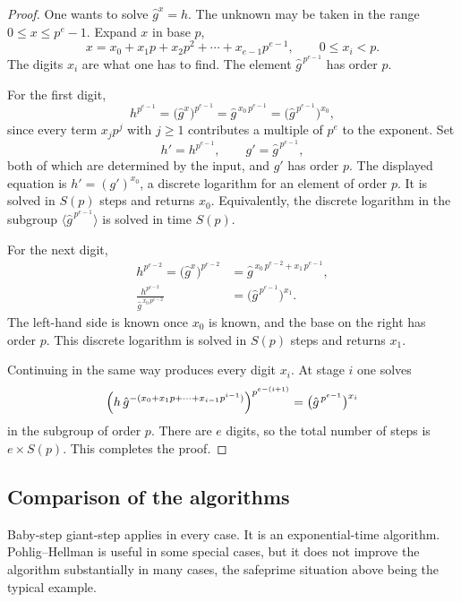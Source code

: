 \begin{proof}
One wants to solve \(\hat g^{x}=h\). The unknown may be taken in the
range \(0\le x\le p^e-1\).
Expand \(x\) in base \(p\),
\[
    x = x_0 + x_1 p + x_2 p^2 + \cdots + x_{e-1}p^{e-1},
    \qquad 0\le x_i<p.
\]
The digits \(x_i\) are what one has to find. The element
\(\hat g^{\,p^{e-1}}\) has order \(p\).

For the first digit, 
\[
    h^{p^{e-1}}
    = \bigl(\hat g^{x}\bigr)^{p^{e-1}}
    = \hat g^{\,x_0\,p^{e-1}}
    = \bigl(\hat g^{\,p^{e-1}}\bigr)^{x_0},
\]
since every term \(x_j p^j\) with \(j\ge 1\) contributes a multiple of
\(p^e\) to the exponent. Set
\[
    h' = h^{p^{e-1}},
    \qquad
    g' = \hat g^{\,p^{e-1}},
\]
both of which are determined by the input, and \(g'\) has order \(p\).
The displayed equation is \(h'=(g')^{x_0}\), a discrete logarithm for an
element of order \(p\). It is solved in \(S(p)\) steps and returns
\(x_0\). Equivalently, the discrete logarithm in the subgroup
\(\langle\hat g^{\,p^{e-1}}\rangle\) is solved in time \(S(p)\).

For the next digit,
\begin{align*}
    h^{p^{e-2}}
    = \bigl(\hat g^{x}\bigr)^{p^{e-2}}
    &= \hat g^{\,x_0\,p^{e-2}+x_1\,p^{e-1}},\\[0.3em]
    \frac{h^{p^{e-2}}}{\hat g^{\,x_0\,p^{e-2}}}
    &= \bigl(\hat g^{\,p^{e-1}}\bigr)^{x_1}.
\end{align*}
The left-hand side is known once \(x_0\) is known, and the base on the
right has order \(p\). This discrete logarithm is solved in \(S(p)\)
steps and returns \(x_1\).

Continuing in the same way produces every digit \(x_i\). At stage \(i\)
one solves
\[
    \Bigl(
        h\,\hat g^{-(x_0+x_1 p+\cdots+x_{i-1}p^{i-1})}
    \Bigr)^{p^{e-(i+1)}}
    =
    \bigl(\hat g^{\,p^{e-1}}\bigr)^{x_i}
\]
in the subgroup of order \(p\). There are \(e\) digits, so the total
number of steps is \(e\times S(p)\). This completes the proof.
\end{proof}


\subsection{Comparison of the algorithms}

Baby-step giant-step applies in every case. It is an exponential-time
algorithm. Pohlig--Hellman is useful in some special cases, but it does
not improve the algorithm substantially in many cases, the safeprime
situation above being the typical example.

